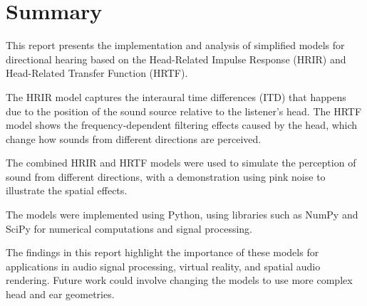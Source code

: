 \chapter*{Summary}

This report presents the implementation and analysis of simplified models for directional hearing based on the Head-Related Impulse Response (HRIR) and Head-Related Transfer Function (HRTF). 

The HRIR model captures the interaural time differences (ITD) that happens due to the position of the sound source relative to the listener's head. The HRTF model shows the frequency-dependent filtering effects caused by the head, which change how sounds from different directions are perceived.

The combined HRIR and HRTF models were used to simulate the perception of sound from different directions, with a demonstration using pink noise to illustrate the spatial effects. 

The models were implemented using Python, using libraries such as NumPy and SciPy for numerical computations and signal processing. 

The findings in this report highlight the importance of these models for applications in audio signal processing, virtual reality, and spatial audio rendering. Future work could involve changing the models to use more complex head and ear geometries. 